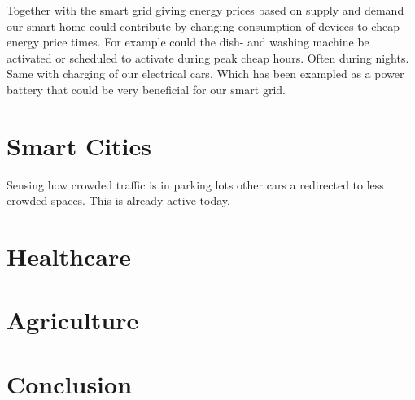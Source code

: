 \documentclass[article,a4paper]{IEEEtran}
\begin{document}
    Together with the smart grid giving energy prices based on supply and demand our smart home could contribute by changing consumption of devices to cheap energy price times. For example could the dish- and washing machine be activated or scheduled to activate during peak cheap hours. Often during nights. Same with charging of our electrical cars. Which has been exampled as a power battery that could be very beneficial for our smart grid. 
    \section{Smart Cities}
    Sensing how crowded traffic is in parking lots other cars a redirected to less crowded spaces. This is already active today. 
    \section{Healthcare}
    
    \section{Agriculture}
    
    \section{Conclusion}

\printbibliography
\end{document}
